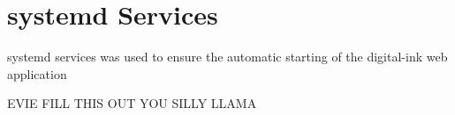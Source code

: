 \section{systemd Services}
systemd services was used to ensure the automatic starting of the digital-ink web application

EVIE FILL THIS OUT YOU SILLY LLAMA
